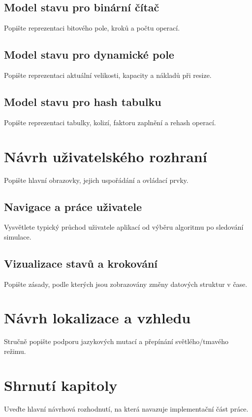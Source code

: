 \subsection{Model stavu pro binární čítač}
Popište reprezentaci bitového pole, kroků a počtu operací.

\subsection{Model stavu pro dynamické pole}
Popište reprezentaci aktuální velikosti, kapacity a nákladů při resize.

\subsection{Model stavu pro hash tabulku}
Popište reprezentaci tabulky, kolizí, faktoru zaplnění a rehash operací.

\section{Návrh uživatelského rozhraní}
Popište hlavní obrazovky, jejich uspořádání a ovládací prvky.

\subsection{Navigace a práce uživatele}
Vysvětlete typický průchod uživatele aplikací od výběru algoritmu po sledování simulace.

\subsection{Vizualizace stavů a krokování}
Popište zásady, podle kterých jsou zobrazovány změny datových struktur v čase.

\section{Návrh lokalizace a vzhledu}
Stručně popište podporu jazykových mutací a přepínání světlého/tmavého režimu.

\section{Shrnutí kapitoly}
Uveďte hlavní návrhová rozhodnutí, na která navazuje implementační část práce.
